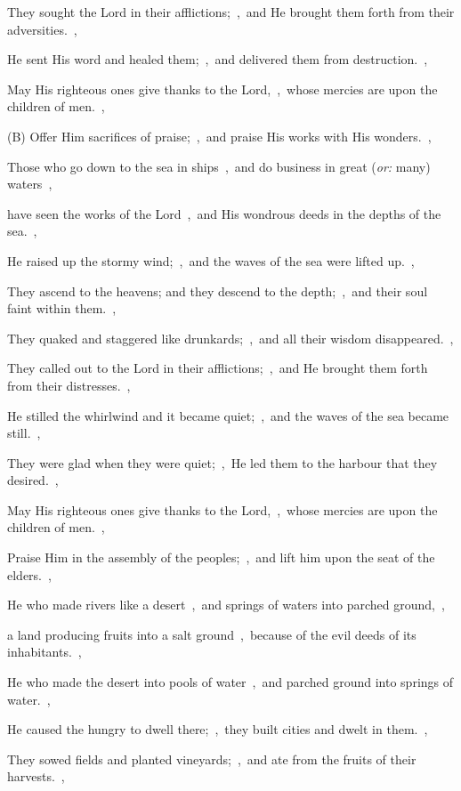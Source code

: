 \documentclass[12pt,twoside,a5paper]{article}
\newcommand{\translationoption}[1]{\emph{or:} #1}
\begin{document}
\begin{normalparskip}
  They sought the Lord in their afflictions;~\sep\ and He brought them forth from their adversities.~\sep

  He sent His word and healed them;~\sep\ and delivered them from destruction.~\sep

  May His righteous ones give thanks to the Lord,~\sep\ whose mercies are upon the children of men.~\sep

  (B) Offer Him sacrifices of praise;~\sep\ and praise His works with His wonders.~\sep

  Those who go down to the sea in ships~\sep\ and do business in great (\translationoption{many}) waters~\sep

  have seen the works of the Lord~\sep\ and His wondrous deeds in the depths of the sea.~\sep

  He raised up the stormy wind;~\sep\ and the waves of the sea were lifted up.~\sep

  They ascend to the heavens; and they descend to the depth;~\sep\ and their soul faint within them.~\sep

  They quaked and staggered like drunkards;~\sep\ and all their wisdom disappeared.~\sep

  They called out to the Lord in their afflictions;~\sep\ and He brought them forth from their distresses.~\sep

  He stilled the whirlwind and it became quiet;~\sep\ and the waves of the sea became still.~\sep

  They were glad when they were quiet;~\sep\ He led them to the harbour that they desired.~\sep

  May His righteous ones give thanks to the Lord,~\sep\ whose mercies are upon the children of men.~\sep

  Praise Him in the assembly of the peoples;~\sep\ and lift him upon the seat of the elders.~\sep

  He who made rivers like a desert~\sep\ and springs of waters into parched ground,~\sep

  a land producing fruits into a salt ground~\sep\ because of the evil deeds of its inhabitants.~\sep

  He who made the desert into pools of water~\sep\ and parched ground into springs of water.~\sep

  He caused the hungry to dwell there;~\sep\ they built cities and dwelt in them.~\sep

  They sowed fields and planted vineyards;~\sep\ and ate from the fruits of their harvests.~\sep


\end{normalparskip}
\end{document}
